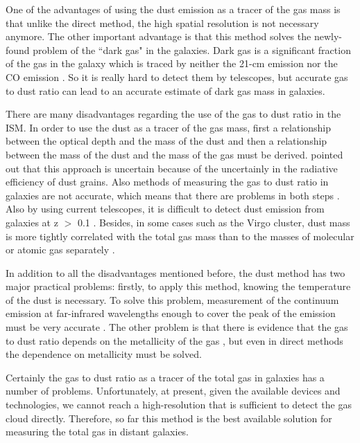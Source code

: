  One of the advantages of using the dust emission as a tracer of the gas mass is that unlike the direct method, the high spatial resolution is not necessary anymore. The other important advantage is that this method solves the newly-found problem of the ``dark gas" in the galaxies. Dark gas is a significant fraction of the gas in the galaxy which is traced by neither the 21-cm emission nor the CO emission \citep{Abdo10}. So it is really hard to detect them by telescopes, but accurate gas to dust ratio can lead to an accurate estimate of dark gas mass in galaxies. 

There are many disadvantages regarding the use of the gas to dust ratio in the ISM. In order to use the dust as a tracer of the gas mass, first a relationship between the optical depth and the mass of the dust and then a relationship between the mass of the dust and the mass of the gas must be derived. \cite{Draine03} pointed out that this approach is uncertain because of the uncertainly in the radiative efficiency of dust grains. Also methods of measuring the gas to dust ratio in galaxies are not accurate, which means that there are problems in both steps \citep{Hildebran83}. Also by using current telescopes, it is difficult to detect dust emission from galaxies at z $>$ 0.1 \citep{Ealas12}. Besides, in some cases such as the Virgo cluster, dust mass is more tightly correlated with the total gas mass than to the masses of molecular or atomic gas separately \citep{Corbelli11}. 

In addition to all the disadvantages mentioned before, the dust method has two major practical problems: firstly, to apply this method, knowing the temperature of the dust is necessary. To solve this problem, measurement of the continuum emission at far-infrared wavelengths enough to cover the peak of the emission must be very accurate \citep{Ealas12}. The other problem is that there is evidence that the gas to dust ratio depends on the metallicity of the gas \citep{Lisenfeld98, Draine07}, but even in direct methods the dependence on metallicity must be solved. 

Certainly the gas to dust ratio as a tracer of the total gas in galaxies has a number of problems. Unfortunately, at present, given the available devices and technologies, we cannot reach a high-resolution that is sufficient to detect the gas cloud directly. Therefore, so far this method is the best available solution for measuring the total gas in distant galaxies. 




